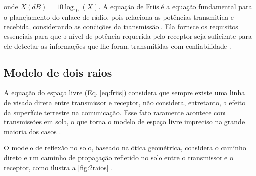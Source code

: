 \noindent onde $X(dB) = 10\log_{10} (X)$. A equação de Friis é a equação fundamental para o planejamento do enlace de rádio, pois relaciona as potências transmitida e recebida, considerando as condições da transmissão \cite{haykin2008}. Ela fornece os requisitos essenciais para que o nível de potência requerida pelo receptor seja suficiente para ele detectar as informações que lhe foram transmitidas com confiabilidade \cite{haykin2008}.

\subsection{Modelo de dois raios}
\label{sub:modelo-2-raios}

A equação do espaço livre (Eq. \eqref{eq:friis}) considera que sempre existe uma linha de visada direta entre transmissor e receptor, não considera, entretanto, o efeito da superfície terrestre na comunicação. Esse fato raramente acontece com transmissões em solo, o que torna o modelo de espaço livre impreciso na grande maioria dos casos \cite{rappaport2009}.

O modelo de reflexão no solo, baseado na ótica geométrica, considera o caminho direto e um caminho de propagação refletido no solo entre o transmissor e o receptor, como ilustra a \autoref{fig:2raios} \cite{rappaport2009}.

\begin{figure}[H]
	\centering
\end{figure}

